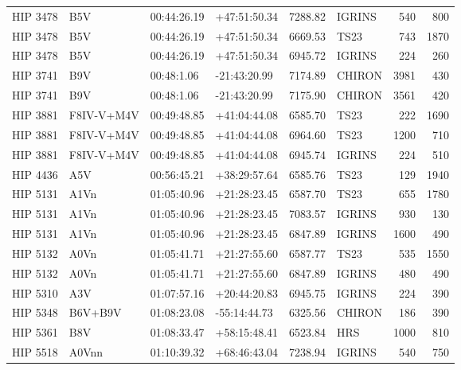 \documentclass{emulateapj}
\begin{document}
\begin{longtable*}{|l|lllrlrr|}
    HIP 3478 &            B5V &    00:44:26.19 &   +47:51:50.34 &  7288.82 &     IGRINS &      540 &     800 \\
    HIP 3478 &            B5V &    00:44:26.19 &   +47:51:50.34 &  6669.53 &       TS23 &      743 &    1870 \\
    HIP 3478 &            B5V &    00:44:26.19 &   +47:51:50.34 &  6945.72 &     IGRINS &      224 &     260 \\
    HIP 3741 &            B9V &     00:48:1.06 &   -21:43:20.99 &  7174.89 &     CHIRON &     3981 &     430 \\
    HIP 3741 &            B9V &     00:48:1.06 &   -21:43:20.99 &  7175.90 &     CHIRON &     3561 &     420 \\
    HIP 3881 &     F8IV-V+M4V &    00:49:48.85 &   +41:04:44.08 &  6585.70 &       TS23 &      222 &    1690 \\
    HIP 3881 &     F8IV-V+M4V &    00:49:48.85 &   +41:04:44.08 &  6964.60 &       TS23 &     1200 &     710 \\
    HIP 3881 &     F8IV-V+M4V &    00:49:48.85 &   +41:04:44.08 &  6945.74 &     IGRINS &      224 &     510 \\
    HIP 4436 &            A5V &    00:56:45.21 &   +38:29:57.64 &  6585.76 &       TS23 &      129 &    1940 \\
    HIP 5131 &           A1Vn &    01:05:40.96 &   +21:28:23.45 &  6587.70 &       TS23 &      655 &    1780 \\
    HIP 5131 &           A1Vn &    01:05:40.96 &   +21:28:23.45 &  7083.57 &     IGRINS &      930 &     130 \\
    HIP 5131 &           A1Vn &    01:05:40.96 &   +21:28:23.45 &  6847.89 &     IGRINS &     1600 &     490 \\
    HIP 5132 &           A0Vn &    01:05:41.71 &   +21:27:55.60 &  6587.77 &       TS23 &      535 &    1550 \\
    HIP 5132 &           A0Vn &    01:05:41.71 &   +21:27:55.60 &  6847.89 &     IGRINS &      480 &     490 \\
    HIP 5310 &            A3V &    01:07:57.16 &   +20:44:20.83 &  6945.75 &     IGRINS &      224 &     390 \\
    HIP 5348 &        B6V+B9V &    01:08:23.08 &   -55:14:44.73 &  6325.56 &     CHIRON &      186 &     390 \\
    HIP 5361 &            B8V &    01:08:33.47 &   +58:15:48.41 &  6523.84 &        HRS &     1000 &     810 \\
    HIP 5518 &          A0Vnn &    01:10:39.32 &   +68:46:43.04 &  7238.94 &     IGRINS &      540 &     750 \\

\end{longtable*}
\end{document}
